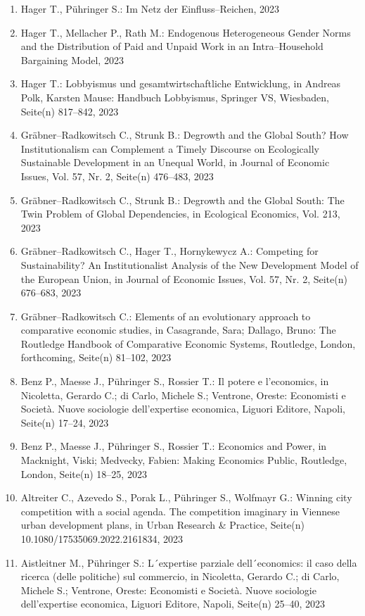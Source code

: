 \begin{enumerate}
	 \item Hager T., Pühringer S.: Im Netz der Einfluss--Reichen, 2023
	 \item Hager T., Mellacher P., Rath M.: Endogenous Heterogeneous Gender Norms and the Distribution of Paid and Unpaid Work in an Intra--Household Bargaining Model, 2023
	 \item Hager T.: Lobbyismus und gesamtwirtschaftliche Entwicklung, in Andreas Polk, Karsten Mause: Handbuch Lobbyismus, Springer VS, Wiesbaden, Seite(n) 817–842, 2023
	 \item Gräbner--Radkowitsch C., Strunk B.: Degrowth and the Global South? How Institutionalism can Complement a Timely Discourse on Ecologically Sustainable Development in an Unequal World, in Journal of Economic Issues, Vol. 57, Nr. 2, Seite(n) 476--483, 2023
	 \item Gräbner--Radkowitsch C., Strunk B.: Degrowth and the Global South: The Twin Problem of Global Dependencies, in Ecological Economics, Vol. 213, 2023
	 \item Gräbner--Radkowitsch C., Hager T., Hornykewycz A.: Competing for Sustainability? An Institutionalist Analysis of the New Development Model of the European Union, in Journal of Economic Issues, Vol. 57, Nr. 2, Seite(n) 676--683, 2023
	 \item Gräbner--Radkowitsch C.: Elements of an evolutionary approach to comparative economic studies, in Casagrande, Sara; Dallago, Bruno: The Routledge Handbook of Comparative Economic Systems, Routledge, London, forthcoming, Seite(n) 81--102, 2023
	 \item Benz P., Maesse J., Pühringer S., Rossier T.: Il potere e l'economics, in Nicoletta, Gerardo C.; di Carlo, Michele S.; Ventrone, Oreste: Economisti e Società. Nuove sociologie dell'expertise economica, Liguori Editore, Napoli, Seite(n) 17--24, 2023
	 \item Benz P., Maesse J., Pühringer S., Rossier T.: Economics and Power, in Macknight, Viski; Medvecky, Fabien: Making Economics Public, Routledge, London, Seite(n) 18--25, 2023
	 \item Altreiter C., Azevedo S., Porak L., Pühringer S., Wolfmayr G.: Winning city competition with a social agenda. The competition imaginary in Viennese urban development plans, in Urban Research \& Practice, Seite(n) 10.1080/17535069.2022.2161834, 2023
	 \item Aistleitner M., Pühringer S.: L´expertise parziale dell´economics: il caso della ricerca (delle politiche) sul commercio, in Nicoletta, Gerardo C.; di Carlo, Michele S.; Ventrone, Oreste: Economisti e Società. Nuove sociologie dell'expertise economica, Liguori Editore, Napoli, Seite(n) 25--40, 2023

\end{enumerate}
